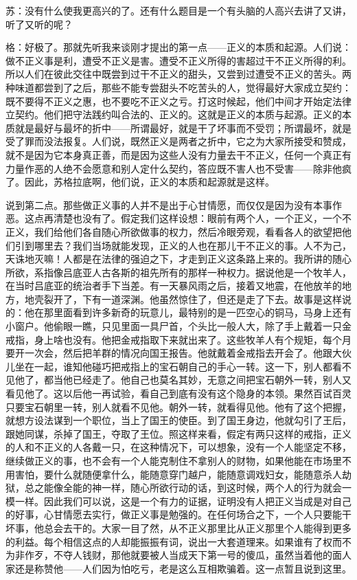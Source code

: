 \documentclass[12pt,oneside]{book}
\begin{document}
苏：没有什么使我更高兴的了。还有什么题目是一个有头脑的人高兴去讲了又讲，听了又听的呢？

格：好极了。那就先听我来谈刚才提出的第一点——正义的本质和起源。人们说：做不正义事是利，遭受不正义是害。遭受不正义所得的害超过干不正义所得的利。所以人们在彼此交往中既尝到过干不正义的甜头，又尝到过遭受不正义的苦头。两种味道都尝到了之后，那些不能专尝甜头不吃苦头的人，觉得最好大家成立契约：既不要得不正义之惠，也不要吃不正义之亏。打这时候起，他们中间才开始定法律立契约。他们把守法践约叫合法的、正义的。这就是正义的本质与起源。正义的本质就是最好与最坏的折中——所谓最好，就是干了坏事而不受罚；所谓最坏，就是受了罪而没法报复。人们说，既然正义是两者之折中，它之为大家所接受和赞成，就不是因为它本身真正善，而是因为这些人没有力量去干不正义，任何一个真正有力量作恶的人绝不会愿意和别人定什么契约，答应既不害人也不受害——除非他疯了。因此，苏格拉底啊，他们说，正义的本质和起源就是这样。

说到第二点。那些做正义事的人并不是出于心甘情愿，而仅仅是因为没有本事作恶。这点再清楚也没有了。假定我们这样设想：眼前有两个人，一个正义，一个不正义，我们给他们各自随心所欲做事的权力，然后冷眼旁观，看看各人的欲望把他们引到哪里去？我们当场就能发现，正义的人也在那儿干不正义的事。人不为己，天诛地灭嘛！人都是在法律的强迫之下，才走到正义这条路上来的。我所讲的随心所欲，系指像吕底亚人古各斯的祖先所有的那样一种权力。据说他是一个牧羊人，在当时吕底亚的统治者手下当差。有一天暴风雨之后，接着又地震，在他放羊的地方，地壳裂开了，下有一道深渊。他虽然惊住了，但还是走了下去。故事是这样说的：他在那里面看到许多新奇的玩意儿，最特别的是一匹空心的铜马，马身上还有小窗户。他偷眼一瞧，只见里面一具尸首，个头比一般人大，除了手上戴着一只金戒指，身上啥也没有。他把金戒指取下来就出来了。这些牧羊人有个规矩，每个月要开一次会，然后把羊群的情况向国王报告。他就戴着金戒指去开会了。他跟大伙儿坐在一起，谁知他碰巧把戒指上的宝石朝自己的手心一转。这一下，别人都看不见他了，都当他已经走了。他自己也莫名其妙，无意之间把宝石朝外一转，别人又看见他了。这以后他一再试验，看自己到底有没有这个隐身的本领。果然百试百灵只要宝石朝里一转，别人就看不见他。朝外一转，就看得见他。他有了这个把握，就想方设法谋到一个职位，当上了国王的使臣。到了国王身边，他就勾引了王后，跟她同谋，杀掉了国王，夺取了王位。照这样来看，假定有两只这样的戒指，正义的人和不正义的人各戴一只，在这种情况下，可以想象，没有一个人能坚定不移，继续做正义的事，也不会有一个人能克制住不拿别人的财物，如果他能在市场里不用害怕，要什么就随便拿什么，能随意穿门越户，能随意调戏妇女，能随意杀人劫狱，总之能像全能的神一样，随心所欲行动的话，到这时候，两个人的行为就会一模一样。因此我们可以说，这是一个有力的证据，证明没有人把正义当成是对自己的好事，心甘情愿去实行，做正义事是勉强的。在任何场合之下，一个人只要能干坏事，他总会去干的。大家一目了然，从不正义那里比从正义那里个人能得到更多的利益。每个相信这点的人却能振振有词，说出一大套道理来。如果谁有了权而不为非作歹，不夺人钱财，那他就要被人当成天下第一号的傻瓜，虽然当着他的面人家还是称赞他——人们因为怕吃亏，老是这么互相欺骗着。这一点暂且说到这里。
\end{document}
